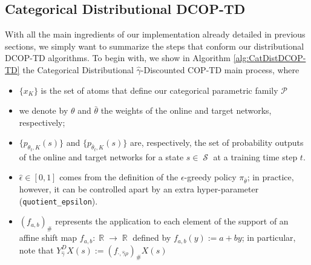 \documentclass[12pt,a4paper,openright,twoside]{article}
\DeclareMathOperator*{\R}{\mathbb{R}}
\DeclareMathOperator*{\Sspace}{\mathcal{S}}
\numberwithin{equation}{section}
\theoremstyle{definition}
\theoremstyle{remark}
\theoremstyle{plain}
\begin{document}
\subsection{Categorical Distributional DCOP-TD}

With all the main ingredients of our implementation already detailed in previous sections, we simply want to summarize the steps that conform our distributional DCOP-TD algorithms. To begin with, we show in Algorithm \ref{alg:CatDistDCOP-TD} the Categorical Distributional $\hat{\gamma}$-Discounted COP-TD main process, where 
\begin{itemize}
	\item $\{x_K\}$ is the set of atoms that define our categorical parametric family $\mathcal{P}$
	\item we denote by $\theta$ and $\bar{\theta}$ the weights of the online and target networks, respectively;
	\item $\{p_{{\theta}_{t},K}(s)\}$ and $\{p_{\bar{\theta}_{t},K}(s)\}$ are, respectively, the set of probability outputs of the online and target networks for a state $s\in \Sspace$ at a training time step $t$.
	\item $\hat{\epsilon} \in [0,1]$ comes from the definition of the $\epsilon$-greedy policy $\pi_{\bar{\theta}}$; in practice, however, it can be controlled apart by  an extra hyper-parameter (\texttt{quotient\_epsilon}).
	\item $(f_{a,b})_\#$ represents the application to each element of the support of an affine shift map $f_{a,b} : \R \rightarrow \R$ defined by $f_{a,b}(y) := a + b y$; in particular, note that $Y_{\hat{\gamma}}^D X(s) := (f_{\cdot,\hat{\gamma}\rho})_{\#} X(s)$
\end{itemize}


\vspace{\fill}
\end{document}
